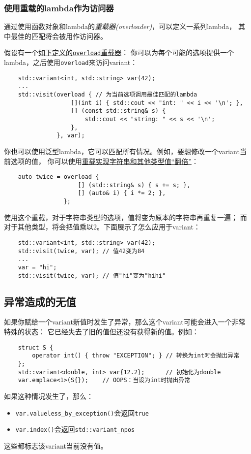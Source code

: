 \subsubsection{使用重载的lambda作为访问器}\label{ch16.3.3.4}
通过使用函数对象和lambda的\emph{重载器(overloader)}，可以定义一系列lambda，
其中最佳的匹配将会被用作访问器。

假设有一个\hyperref[ch14.1]{如下定义的\texttt{overload}重载器}：
你可以为每个可能的选项提供一个lambda，之后使用\texttt{overload}来访问variant：
\begin{lstlisting}
    std::variant<int, std::string> var(42);
    ...
    std::visit(overload { // 为当前选项调用最佳匹配的lambda
                   [](int i) { std::cout << "int: " << i << '\n'; },
                   [] (const std::string& s) {
                       std::cout << "string: " << s << '\n';
                   },
               }, var);
\end{lstlisting}
你也可以使用泛型lambda，它可以匹配所有情况。例如，要想修改一个variant当前选项的值，
你可以使用\hyperref[重载的两倍lambda]{重载实现字符串和其他类型值“翻倍”}：
\begin{lstlisting}
    auto twice = overload {
                     [] (std::string& s) { s += s; },
                     [] (auto& i) { i *= 2; },
                 };
\end{lstlisting}
使用这个重载，对于字符串类型的选项，值将变为原本的字符串再重复一遍；
而对于其他类型，将会把值乘以2。下面展示了怎么应用于variant：
\begin{lstlisting}
    std::variant<int, std::string> var(42);
    std::visit(twice, var); // 值42变为84
    ...
    var = "hi";
    std::visit(twice, var); // 值"hi"变为"hihi"
\end{lstlisting}

\subsection{异常造成的无值}\label{ch16.3.4}
如果你赋给一个variant新值时发生了异常，那么这个variant可能会进入一个非常特殊的状态：
它已经失去了旧的值但还没有获得新的值。例如：
\begin{lstlisting}
    struct S {
        operator int() { throw "EXCEPTION"; } // 转换为int时会抛出异常
    };
    std::variant<double, int> var{12.2};      // 初始化为double
    var.emplace<1>(S{});    // OOPS：当设为int时抛出异常
\end{lstlisting}
如果这种情况发生了，那么：
\begin{itemize}
    \item \texttt{var.valueless\_by\_exception()}会返回\texttt{true}
    \item \texttt{var.index()}会返回\texttt{std::variant\_npos}
\end{itemize}
这些都标志该variant当前没有值。

